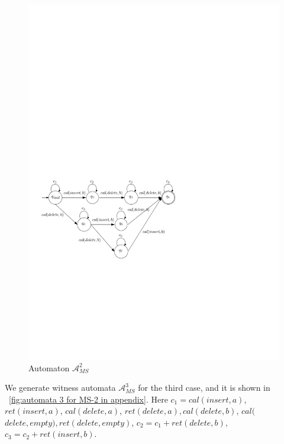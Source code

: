 {\begin{figure}[htbp]
  \centering
  \includegraphics[width=0.7 \textwidth]{figures/PIC_AUTO_MS_2.pdf}
  \caption{Automaton $\mathcal{A}_{\textit{MS}}^2$}
  \label{fig:automata 2 for MS-2 in appendix}
\end{figure}


We generate witness automata $\mathcal{A}_{\textit{MS}}^3$ for the third case, and it is shown in \figurename~\ref{fig:automata 3 for MS-2 in appendix}. Here $c_1 = \textit{cal}(\textit{insert},a)$, $\textit{ret}(\textit{insert},a)$, $\textit{cal}(\textit{delete},a)$, $\textit{ret}(\textit{delete},a),\textit{cal}(\textit{delete},b)$, $\textit{cal}($ $\textit{delete},\textit{empty}),\textit{ret}(\textit{delete},\textit{empty})$, $c_2 = c_1 + \textit{ret}(\textit{delete},b)$, $c_3 = c_2 + \textit{ret}(\textit{insert},b)$.

}
